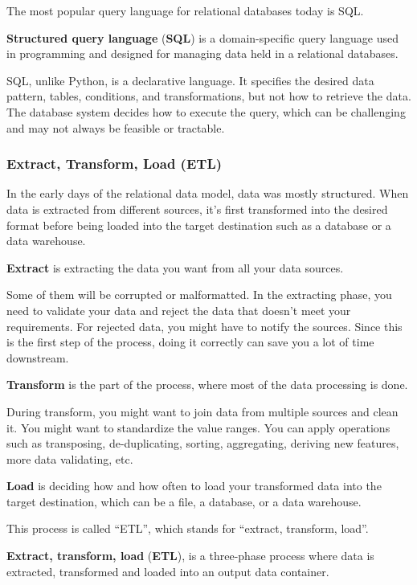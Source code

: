 The most popular query language for relational databases today is SQL\@.

\textbf{Structured query language} (\textbf{SQL}) is a domain-specific query language used in programming and designed
for managing data held in a relational databases.
\ed

SQL, unlike Python, is a declarative language. It specifies the desired data pattern, tables, conditions, and
transformations, but not how to retrieve the data. The database system decides how to execute the query, which can be
challenging and may not always be feasible or tractable.

\subsubsection{Extract, Transform, Load (ETL)}

In the early days of the relational data model, data was mostly structured. When data is extracted from different
sources, it's first transformed into the desired format before being loaded into the target destination such as a
database or a data warehouse.

\bd[Extract]
\textbf{Extract} is extracting the data you want from all your data sources.
\ed

Some of them will be corrupted or malformatted. In the extracting phase, you need to validate your data and reject
the data that doesn't meet your requirements. For rejected data, you might have to notify the sources. Since this is
the first step of the process, doing it correctly can save you a lot of time downstream.

\bd[Transform]
\textbf{Transform} is the part of the process, where most of the data processing is done.
\ed

During transform, you might want to join data from multiple sources and clean it. You might want to standardize the
value ranges. You can apply operations such as transposing, de-duplicating, sorting, aggregating, deriving new
features, more data validating, etc.

\bd[Load]
\textbf{Load} is deciding how and how often to load your transformed data into the target destination, which can be a
file, a database, or a data warehouse.
\ed

This process is called ``ETL'', which stands for ``extract, transform, load''.

\textbf{Extract, transform, load} (\textbf{ETL}), is a three-phase process where data is extracted, transformed and
loaded into an output data container.
\ed

